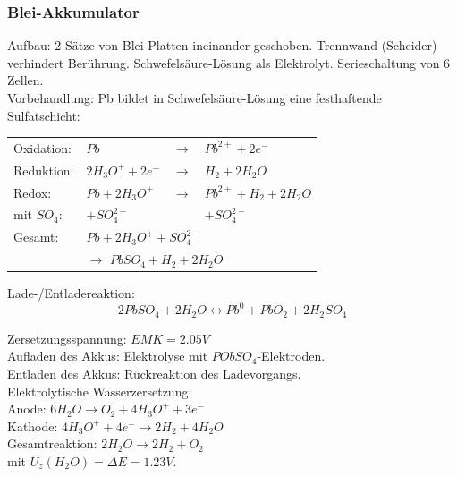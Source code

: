 \subsubsection{Blei-Akkumulator}
Aufbau: 2 Sätze von Blei-Platten ineinander geschoben. Trennwand (Scheider) verhindert Berührung. Schwefelsäure-Lösung als Elektrolyt. Serieschaltung von 6 Zellen. \\

Vorbehandlung: Pb bildet in Schwefelsäure-Lösung eine festhaftende Sulfatschicht: \\

\begin{table}[htbp]
	\begin{tabular}{llll}
		Oxidation: & $Pb$ & $\rightarrow$ & $Pb^{2+} + 2 e^-$ \\
		Reduktion: & $2 H_3O^+ + 2 e^-$ & $\rightarrow$ & $H_2 + 2 H_2O$ \\ \hline
		Redox: & $Pb + 2 H_3O^+$ & $\rightarrow$ & $Pb^{2+} + H_2 + 2 H_2O$ \\
		mit $SO_4$: & $+ SO_4^{2-}$ & & $+ SO_4^{2-}$ \\ \hline
		Gesamt: & \multicolumn{3}{l}{$Pb + 2 H_3O^+ + SO_4^{2-}$} \\
		& \multicolumn{3}{l}{\qquad $\rightarrow$ $PbSO_4 + H_2 + 2 H_2O$} \\
	\end{tabular}
\end{table}


Lade-/Entladereaktion: \\
\begin{equation*}
	2 PbSO_4 + 2 H_2O \leftrightarrow Pb^0 + PbO_2 + 2 H_2SO_4
\end{equation*}

Zersetzungsspannung: $EMK = 2.05V$ \\

Aufladen des Akkus: Elektrolyse mit $PObSO_4$-Elektroden. \\
Entladen des Akkus: Rückreaktion des Ladevorgangs. \\

Elektrolytische Wasserzersetzung: \\
Anode: $6 H_2O \rightarrow O_2 + 4 H_3O^+ +  3e^-$ \\
Kathode: $4 H_3O^+ + 4 e^- \rightarrow 2 H_2 + 4 H_2O$ \\
Gesamtreaktion: $2 H_2O \rightarrow 2 H_2 + O_2$ \\

mit $U_z(H_2O) = \Delta E = 1.23V$. \\


